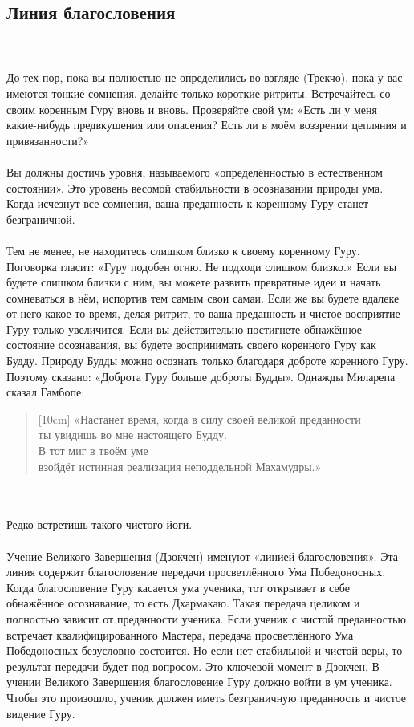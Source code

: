 \subsection{Линия благословения}
\\ \\ До тех пор, пока вы полностью не определились во взгляде (Трекчо), пока у вас имеются тонкие сомнения, делайте только короткие ритриты. Встречайтесь со своим коренным Гуру вновь и вновь. Проверяйте свой ум: «Есть ли у меня какие-нибудь предвкушения или опасения? Есть ли в моём воззрении цепляния и привязанности?»
\newpage
\\ \\ Вы должны достичь уровня, называемого «определённостью в естественном состоянии». Это уровень весомой стабильности в осознавании природы ума. Когда исчезнут все сомнения, ваша преданность к коренному Гуру станет безграничной.
\\ \\ Тем не менее, не находитесь слишком близко к своему коренно\-му Гуру. Поговорка гласит: «Гуру подобен огню. Не подходи слишком близко.» Если вы будете слишком близки с ним, вы можете развить превратные идеи и начать сомневаться в нём, испортив тем самым свои самаи. Если же вы будете вдалеке от него какое-то время, делая ритрит, то ваша преданность и чистое восприятие Гуру только увеличится. Если вы действительно постигнете обнажённое состояние осознавания, вы будете воспринимать своего коренного Гуру как Будду. Природу Будды можно осознать только благодаря доброте коренного Гуру. Поэтому сказано: «Доброта Гуру больше доброты Будды». Однажды Миларепа сказал Гамбопе:
\begin{verse}[10cm]
«Настанет время, когда в силу своей великой преданности
\\ \indent ты увидишь во мне настоящего Будду. \\
В тот миг в твоём уме
\\ \indent взойдёт истинная реализация неподдельной Махамудры.»
\end{verse}
\\ \\ Редко встретишь такого чистого йоги.
\\ \\ Учение Великого Завершения (Дзокчен) именуют «линией благословения». Эта линия содержит благословение передачи просветлённого Ума Победоносных. Когда благословение Гуру касается ума ученика, тот открывает в себе обнажённое осознавание, то есть Дхармакаю. Такая передача целиком и полностью зависит от преданности ученика. Если ученик с чистой преданностью встречает квалифицированного Мастера, передача просветлённого Ума Победоносных безусловно состоится. Но если нет стабильной и чистой веры, то результат передачи будет под вопросом. Это ключевой момент в Дзокчен. В учении Великого Завершения благословение Гуру должно войти в ум ученика. Чтобы это произошло, ученик должен иметь безграничную преданность и чистое видение Гуру.
